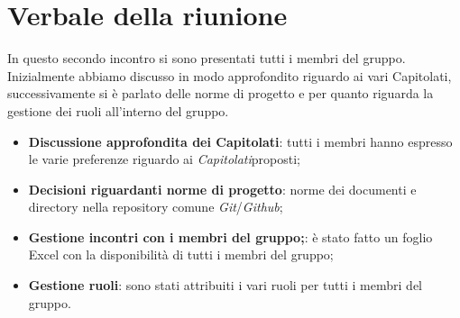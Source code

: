 \section{Verbale della riunione}
		In questo secondo incontro si sono presentati tutti i membri del gruppo. Inizialmente abbiamo discusso in modo approfondito riguardo ai vari Capitolati\glos, successivamente si è parlato delle norme di progetto e per quanto riguarda la gestione dei ruoli all'interno del gruppo.
	\begin{itemize}
		\item \textbf {Discussione approfondita dei Capitolati\glos}: tutti i membri hanno espresso le varie preferenze riguardo ai \textit{Capitolati}\glo proposti;
		\item \textbf {Decisioni riguardanti norme di progetto}: norme dei documenti e directory nella repository comune \textit{Git}\glos/\textit{Github}\glos;
		\item \textbf {Gestione incontri con i membri del gruppo;}: è stato fatto un foglio Excel con la disponibilità di tutti i membri del gruppo;
		\item \textbf {Gestione ruoli}: sono stati attribuiti i vari ruoli per tutti i membri del gruppo.
	\end{itemize}
